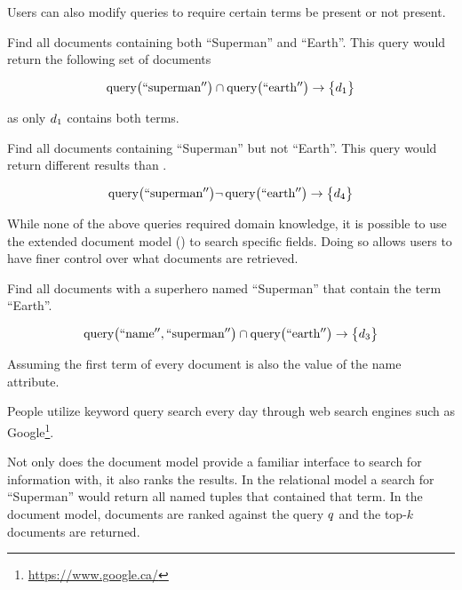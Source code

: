 		Users can also modify queries to require certain terms be present or not present.
		
		\begin{ex}
		\label{ex:and-query}
			Find all documents containing both ``Superman'' and ``Earth''.	This query would return the following set of documents
			
			\[
				\operatorname{query}\bigl(\mathrm{``superman''}\bigr) \cap \operatorname{query}\bigl(\mathrm{``earth''}\bigr) \rightarrow \bigl\{d_1\bigr\}
			\]
			
			as only $d_1$ contains both terms.
		\end{ex}
		
		\begin{ex}
			Find all documents containing ``Superman'' but not ``Earth''.  This query would return different results than .
			
			\[
				\operatorname{query}\bigl(\mathrm{``superman''}\bigr) \neg\operatorname{query}\bigl(\mathrm{``earth''}\bigr) \rightarrow \bigl\{d_4\bigr\}
			\]
		\end{ex}
		
		While none of the above queries required domain knowledge, it is possible to use the extended document model () to search specific fields.  Doing so allows users to have finer control over what documents are retrieved.
		
		\begin{ex}
			Find all documents with a superhero named ``Superman'' that contain the term ``Earth''.
			
			\[
				\operatorname{query}\bigl(\mathrm{``name''}, \mathrm{``superman''}\bigr) \cap \operatorname{query}\bigl(\mathrm{``earth''}\bigr) \rightarrow \bigl\{d_3\bigr\}
			\]
			
			Assuming the first term of every document is also the value of the name attribute.
		\end{ex}
		
		People utilize keyword query search every day through web search engines such as Google\footnote{\url{https://www.google.ca/}}.
		
		Not only does the document model provide a familiar interface to search for information with, it also ranks the results.  In the relational model a search for ``Superman'' would return all named tuples that contained that term.	 In the document model, documents are ranked against the query $q$ and the top-$k$ documents are returned.
		
